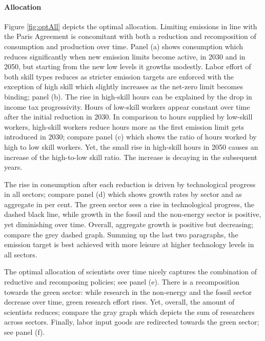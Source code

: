 \paragraph{Allocation}
Figure \ref{fig:optAll} depicts the optimal allocation. Limiting emissions in line with the Paris Agreement is concomitant with both a reduction and recomposition of consumption and production over time. 
Panel (a) shows consumption which reduces significantly when new emission limits become active, in 2030 and in 2050, but starting from the new low levels it growths modestly. Labor effort of both skill types reduces as stricter emission targets are enforced with the exception of high skill which slightly increases as the net-zero limit becomes binding; panel (b). The rise in high-skill hours can be explained by the drop in income tax progressivity. Hours of low-skill workers appear constant over time after the initial reduction in 2030.  In comparison to hours supplied by low-skill workers, high-skill workers reduce hours more as the first emission limit gets introduced in 2030; compare panel (c) which shows the ratio of hours worked by high to low skill workers. Yet, the small rise in high-skill hours in 2050 causes an increase of the high-to-low skill ratio. The increase is decaying in the subsequent years.

The rise in consumption after each reduction is driven by technological progress in all sectors; compare panel (d) which shows growth rates by sector and as aggregate in per cent. 
The green sector sees a rise in technological progress, the dashed black line, while growth in the fossil and the non-energy sector is positive, yet diminishing over time. Overall, aggregate growth is positive but decreasing; compare the grey dashed graph. 
Summing up the last two paragraphs, the emission target is best achieved with more leisure at higher technology levels in all sectors. 

The optimal allocation of scientists over time nicely captures the combination of reductive and recomposing policies; see panel (e). There is a recomposition towards the green sector: while research in the non-energy and the fossil sector decrease over time, green research effort rises. Yet, overall, the amount of scientists reduces; compare the gray graph which depicts the sum of researchers across sectors.  
Finally, labor input goods are redirected towards the green sector; see panel (f). 

